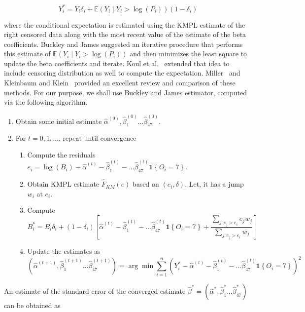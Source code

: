 \documentclass[a4paper,12pt]{article}
\newcommand{\ind}[1]{\boldsymbol{1}\left\{ #1 \right\}}
\begin{document}
$$
Y_i^\ast = Y_i \delta_i + \mathbb{E}(Y_i \mid Y_i > \log(P_i)) (1 - \delta_i)
$$

\noindent where the conditional expectation is estimated using the KMPL estimate of the right censored data along with the most recent value of the estimate of the beta coefficients. Buckley and James suggested an iterative procedure that performs this estimate of $\mathbb{E}(Y_i \mid Y_i > \log(P_i))$ and then minimizes the least square to update the beta coefficients and iterate. Koul et al.~\cite{koul1981regression} extended that idea to include censoring distribution as well to compute the expectation. Miller~\cite{miller1982regression} and Kleinbaum and Klein~\cite{kleinbaum2010survival} provided an excellent review and comparison of these methods. For our purpose, we shall use Buckley and James estimator, computed via the following algorithm.

\begin{enumerate}
    \item Obtain some initial estimate $\widehat{\alpha}^{(0)}, \widehat{\beta}_1^{(0)} \dots \widehat{\beta}_{47}^{(0)}$.
    \item For $t = 0, 1, \dots$, repeat until convergence
    \begin{enumerate}
        \item Compute the residuals $e_i = \log(B_i) - \widehat{\alpha}^{(t)} - \widehat{\beta}_1^{(t)} - \dots \widehat{\beta}_{47}^{(t)} \ind{O_i = 7}$.
        \item Obtain KMPL estimate $\widehat{F}_{KM}(e)$ based on $(e_i, \delta)$. Let, it has a jump $w_i$ at $e_i$.
        \item Compute $B_i^\ast = B_i\delta_i + (1-\delta_i)\left[ \widehat{\alpha}^{(t)} - \widehat{\beta}_1^{(t)} - \dots \widehat{\beta}_{47}^{(t)} \ind{O_i = 7} + \dfrac{\sum_{j: e_j > e_i} e_j w_j }{\sum_{j: e_j > e_i} w_j} \right]$
        \item Update the estimates as
        $$
        \left( \widehat{\alpha}^{(t+1)}, \widehat{\beta}_1^{(t+1)} \dots \widehat{\beta}_{47}^{(t+1)} \right) = \arg\min \sum_{i=1}^n \left( Y_i^\ast - \widehat{\alpha}^{(t)} - \widehat{\beta}_1^{(t)} - \dots \widehat{\beta}_{47}^{(t)} \ind{O_i = 7} \right)^2
        $$
    \end{enumerate}
\end{enumerate}

\noindent An estimate of the standard error of the converged estimate $\widehat{\beta}^\ast = \left(\widehat{\alpha}^{\ast}, \widehat{\beta}_1^{\ast} \dots \widehat{\beta}_{47}^{\ast}\right)$ can be obtained as 
\end{document}
